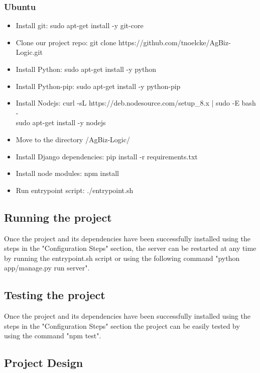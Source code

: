 \documentclass[onecolumn, draftclsnofoot,10pt, compsoc]{article}
\begin{document}
        \subsubsection{Ubuntu}
            \begin{itemize}
                \item Install git: sudo apt-get install -y git-core
                \item Clone our project repo: git clone https://github.com/tnoelcke/AgBiz-Logic.git
                \item Install Python: sudo apt-get install -y python
                \item Install Python-pip: sudo apt-get install -y python-pip
                \item Install Nodejs: curl -sL https://deb.nodesource.com/setup\_8.x | sudo -E bash - \\
                      sudo apt-get install -y nodejs
                \item Move to the directory /AgBiz-Logic/
                \item Install Django dependencies: pip install -r requirements.txt
                \item Install node modules: npm install
                \item Run entrypoint script: ./entrypoint.sh
            \end{itemize}
    
    \subsection{Running the project}
        Once the project and its dependencies have been successfully installed using the steps in the "Configuration Steps" section, the server can be restarted at any time by running the entrypoint.sh script or using the following command "python app/manage.py run server". 
    
    \subsection{Testing the project}
        Once the project and its dependencies have been successfully installed using the steps in the "Configuration Steps" section the project can be easily tested by using the command "npm test".
    
    \subsection{Project Design}
\end{document}
